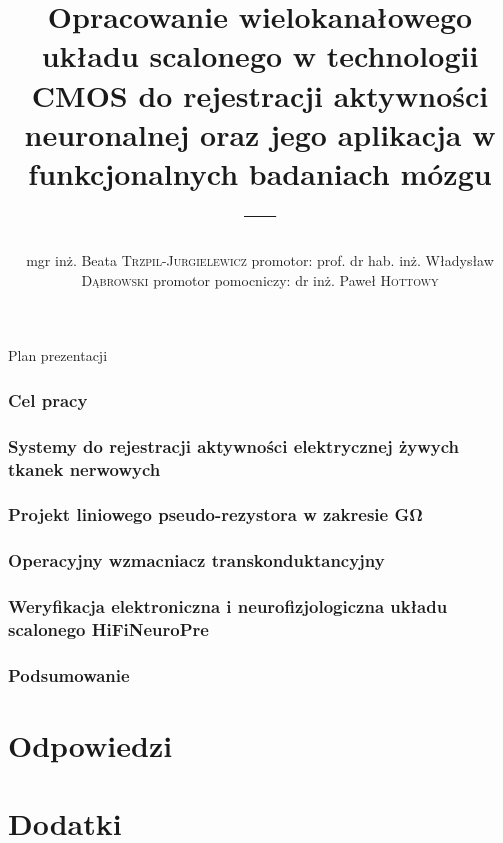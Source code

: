 \documentclass[aspectratio=1610, polish]{beamer}
\author[Beata Trzpil-Jurgielewicz]{mgr inż. Beata \textsc{Trzpil-Jurgielewicz}
\newline 
promotor:
\newline
prof. dr hab. inż. Władysław \textsc{Dąbrowski} 
\newline 
promotor pomocniczy:
\newline
dr inż. Paweł \textsc{Hottowy}}
\date{}
\title[]{Opracowanie wielokanałowego układu scalonego w technologii CMOS do rejestracji aktywności neuronalnej oraz jego aplikacja w funkcjonalnych badaniach mózgu
	}
\title{---}
\begin{document}


\maketitle


\begin{frame}{Plan prezentacji}
	\tableofcontents%
\end{frame}
\section{Cel pracy}

\section{Systemy do rejestracji aktywności elektrycznej żywych tkanek nerwowych}
\section{Projekt liniowego pseudo-rezystora w zakresie \si{\giga\ohm}}
\section{Operacyjny wzmacniacz transkonduktancyjny}
\section{Weryfikacja elektroniczna i neurofizjologiczna układu scalonego HiFiNeuroPre}
\section{Podsumowanie}












\part{Odpowiedzi}



\part{Dodatki}

\end{document}
